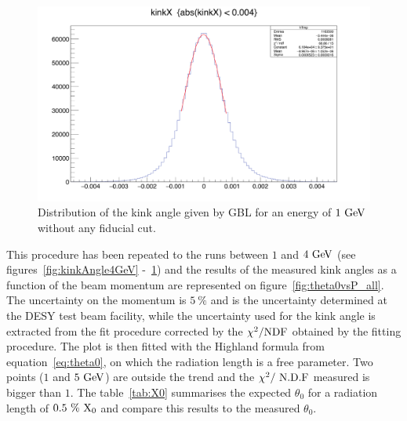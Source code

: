    \begin{figure}[!p]
     \centering
     \includegraphics[width = \textwidth]{Pictures/X0/kinkAngle1GeV.png}
     \caption{Distribution of the kink angle given by GBL for an energy of $1~\rm{GeV}$ without any fiducial cut.}
     \label{fig:kinkAngle1GeV}
   \end{figure} 

   This procedure has been repeated to the runs between $1$ and $4~\rm{GeV}$ (see figures~\ref{fig:kinkAngle4GeV} -~\ref{fig:kinkAngle1GeV}) and the results of the measured kink angles as a function of the beam momentum are represented on figure~\ref{fig:theta0vsP_all}. 
   The uncertainty on the momentum is $5~\%$ and is the uncertainty determined at the DESY test beam facility, while the uncertainty used for the kink angle is extracted from the fit procedure corrected by the $\chi^2 / \rm{NDF}$ obtained by the fitting procedure.
   The plot is then fitted with the Highland formula from equation~\ref{eq:theta0}, on which the radiation length is a free parameter.
   Two points ($1$ and $5~\rm{GeV}$) are outside the trend and the $\chi^2 /~\rm{N.D.F}$ measured is bigger than $1$.
   The table~\ref{tab:X0} summarises the expected $\theta_0$ for a radiation length of $0.5~\%~\rm{X_0}$ and compare this results to the measured $\theta_0$.

